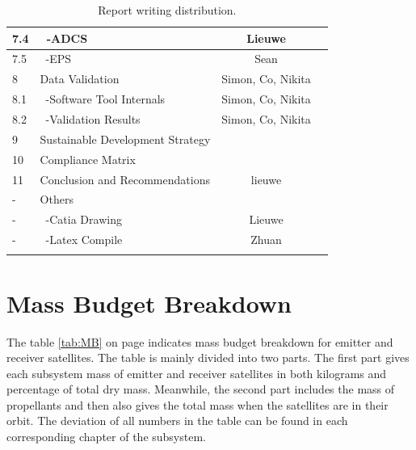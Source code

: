 \begin{center}
\begin{longtable}{|l|l|c|c|}
 7.4     & \ -ADCS                              & Lieuwe &\\\hline
 7.5     & \ -EPS                               & Sean &\\\hline
 8       & Data Validation                      & Simon, Co, Nikita &\\\hline
 8.1     & \ -Software Tool Internals           & Simon, Co, Nikita &\\\hline
 8.2     & \ -Validation Results                & Simon, Co, Nikita &\\\hline
 9       & Sustainable Development Strategy     &&\\\hline
 10      & Compliance Matrix                    &&\\\hline\hline
 11      & Conclusion and Recommendations       & lieuwe &\\\hline\hline
 -       & Others                               &&\\\hline
 -       & \ -Catia Drawing                     & Lieuwe &\\\hline
 -       & \ -Latex Compile                     & Zhuan &\\\hline

\caption{Report writing distribution.}
\label{tab:RWD}
\end{longtable}
\end{center}

\section{Mass Budget Breakdown}
\label{DDMBB}
The table \ref{tab:MB} on page \pageref{tab:MB} indicates mass budget breakdown for emitter and receiver satellites. The table is mainly divided into two parts. The first part gives each subsystem mass of emitter and receiver satellites in both kilograms and percentage of total dry mass. Meanwhile, the second part includes the mass of propellants and then also gives the total mass when the satellites are in their orbit. The deviation of all numbers in the table can be found in each corresponding chapter of the subsystem.

